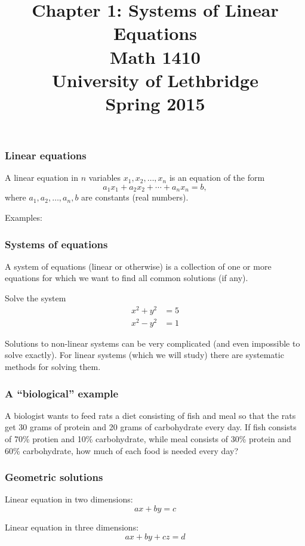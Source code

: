 \documentclass{beamer}
\date{}
\title{Chapter 1: Systems of Linear Equations\\Math 1410\\University of Lethbridge\\Spring 2015}
\begin{document}
\begin{frame}
 \titlepage
\end{frame}
\begin{frame}\frametitle{Linear equations}
 \begin{definition}
  A \alert{linear equation} in $n$ variables $x_1, x_2, \ldots, x_n$ is an equation of the form
\[
 a_1x_1+a_2x_2+\cdots + a_nx_n = b,
\]
where $a_1,a_2,\ldots, a_n, b$ are constants (real numbers).
 \end{definition}

\bigskip

Examples:

\vspace{2in}

\end{frame}
\begin{frame}\frametitle{Systems of equations}
 A \alert{system of equations} (linear or otherwise) is a collection of one or more equations for which we want to find all common solutions (if any).
\begin{example}
 Solve the system
\begin{align*}
 x^2+y^2 &= 5\\
 x^2-y^2 &= 1
\end{align*}
\end{example}
Solutions to non-linear systems can be very complicated (and even impossible to solve exactly). For linear systems (which we will study) there are systematic methods for solving them.
\end{frame}
\begin{frame}\frametitle{A ``biological'' example}
 \begin{example}
A biologist wants to feed rats a diet consisting of fish and meal so that the rats get 30 grams of protein and 20 grams of carbohydrate every day. If fish consists of 70\% protien and 10\% carbohydrate, while meal consists of 30\% protein and 60\% carbohydrate, how much of each food is needed every day?
 \end{example}
\vspace{2in}

\end{frame}
\begin{frame}\frametitle{Geometric solutions}
 Linear equation in two dimensions:
\[
 ax+by = c
\]

\vspace{0.75in}

 Linear equation in three dimensions:
\[
 ax+by+cz=d
\]

\vspace{0.5in}

\end{frame}
\end{document}
